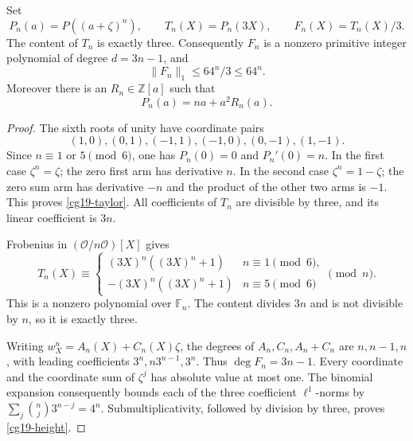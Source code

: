 \begin{proposition}
\label{cg19-content}
Set
\[
 P_n(a)=P((a+\zeta)^n),\qquad T_n(X)=P_n(3X),\qquad
 F_n(X)=T_n(X)/3.
\]
The content of \(T_n\) is exactly three. Consequently \(F_n\) is
a nonzero primitive integer polynomial of degree \(d=3n-1\), and
\begin{equation}
 \|F_n\|_1\le64^n/3\le64^n.
 \label{cg19-height}
\end{equation}
Moreover there is an \(R_n\in\mathbb Z[a]\) such that
\begin{equation}
 P_n(a)=na+a^2R_n(a).
 \label{cg19-taylor}
\end{equation}
\end{proposition}
\begin{proof}
The sixth roots of unity have coordinate pairs
\[
 (1,0),(0,1),(-1,1),(-1,0),(0,-1),(1,-1).
\]
Since \(n\equiv1\) or \(5\pmod6\), one has \(P_n(0)=0\) and
\(P_n'(0)=n\). In the first case \(\zeta^n=\zeta\); the zero
first arm has derivative \(n\). In the second case
\(\zeta^n=1-\zeta\); the zero sum arm has derivative \(-n\) and
the product of the other two arms is \(-1\). This proves
\eqref{cg19-taylor}. All coefficients of \(T_n\) are divisible
by three, and its linear coefficient is \(3n\).

Frobenius in \((\mathcal O/n\mathcal O)[X]\) gives
\begin{equation}
 T_n(X)\equiv
 \begin{cases}
  (3X)^n((3X)^n+1)&n\equiv1\pmod6,\\
  -(3X)^n((3X)^n+1)&n\equiv5\pmod6
 \end{cases}\pmod n.
 \label{cg19-frobenius}
\end{equation}
This is a nonzero polynomial over \(\mathbb F_n\). The content
divides \(3n\) and is not divisible by \(n\), so it is exactly
three.

Writing \(w_X^n=A_n(X)+C_n(X)\zeta\), the degrees of
\(A_n,C_n,A_n+C_n\) are \(n,n-1,n\), with leading coefficients
\(3^n,n3^{n-1},3^n\). Thus \(\deg F_n=3n-1\).
Every coordinate and the coordinate sum of \(\zeta^j\) has absolute
value at most one. The binomial expansion consequently bounds each
of the three coefficient \(\ell^1\)-norms by
\(\sum_j\binom nj3^{n-j}=4^n\). Submultiplicativity, followed by
division by three, proves \eqref{cg19-height}.
\end{proof}

